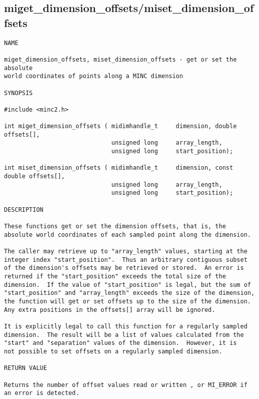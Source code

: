 \documentclass{article}
\begin{document}
\subsection{miget\_dimension\_offsets/miset\_dimension\_offsets}
\begin{verbatim}
NAME

miget_dimension_offsets, miset_dimension_offsets - get or set the absolute
world coordinates of points along a MINC dimension

SYNOPSIS

#include <minc2.h>

int miget_dimension_offsets ( midimhandle_t     dimension, double       offsets[],
                              unsigned long     array_length, 
                              unsigned long     start_position);

int miset_dimension_offsets ( midimhandle_t     dimension, const double offsets[],
                              unsigned long     array_length, 
                              unsigned long     start_position);

DESCRIPTION

These functions get or set the dimension offsets, that is, the
absolute world coordinates of each sampled point along the dimension.

The caller may retrieve up to "array_length" values, starting at the
integer index "start_position".  Thus an arbitrary contiguous subset
of the dimension's offsets may be retrieved or stored.  An error is
returned if the "start_position" exceeds the total size of the
dimension.  If the value of "start_position" is legal, but the sum of
"start_position" and "array_length" exceeds the size of the dimension,
the function will get or set offsets up to the size of the dimension.
Any extra positions in the offsets[] array will be ignored.

It is explicitly legal to call this function for a regularly sampled
dimension.  The result will be a list of values calculated from the
"start" and "separation" values of the dimension.  However, it is 
not possible to set offsets on a regularly sampled dimension.

RETURN VALUE

Returns the number of offset values read or written , or MI_ERROR if
an error is detected.
\end{verbatim}
\end{document}
